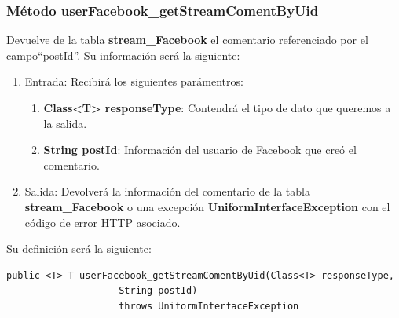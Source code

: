\subsubsection{Método userFacebook\_getStreamComentByUid}
Devuelve de la tabla \textbf{stream\_Facebook} el comentario referenciado por el campo``postId''. Su información será la siguiente:
\begin{enumerate}
\item Entrada: Recibirá los siguientes parámentros:
\begin{enumerate}
\item \textbf{Class<T> responseType}: Contendrá el tipo de dato que queremos a la salida. 
\item \textbf{String postId}: Información del usuario de Facebook que creó el comentario.
\end{enumerate}
\item Salida: Devolverá la información del comentario de la tabla \textbf{stream\_Facebook} o una excepción \textbf{UniformInterfaceException} con el código de error HTTP asociado.
\end{enumerate}
\bigskip
\par
Su definición será la siguiente:
\begin{verbatim}public <T> T userFacebook_getStreamComentByUid(Class<T> responseType, 
					String postId) 
					throws UniformInterfaceException\end{verbatim}

